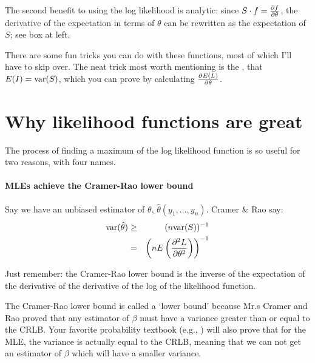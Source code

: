 The second benefit to using the log likelihood is analytic: since $S \cdot
f = {\partial f \over \partial \theta}$, the derivative of the expectation
in terms of $\theta$ can be rewritten as the expectation of $S$; see box
at left.

There are some fun tricks you can do with these functions, most of which
I'll have to skip over.  The neat trick most worth mentioning is the
, that $E(I)=\hbox{var}(S)$, which you can prove by
calculating ${\partial E(L)\over \partial \theta}$.

\section{Why likelihood functions are great} The process of finding a
maximum of the log likelihood function is 
so useful for two reasons, with four names.

\paragraph{MLEs achieve the Cramer-Rao lower bound} 
        		\label{cr} 
Say we have an unbiased estimator of $\theta$,
$\hat\theta(y_1,\dots,y_n)$. Cramer \& Rao say:
\begin{eqnarray}
\hbox{var}(\hat\theta)&\geq&(n \hbox{var}(S))^{-1}		\nonumber\\
		&=&\left(nE\left({\partial^2 L\over \partial
\theta^2}\right)\right)^{-1}			\label{CRLB}
\end{eqnarray}

Just remember: the Cramer-Rao lower bound is the inverse of the expectation of the
derivative of the derivative of the log of the likelihood function.

The Cramer-Rao lower bound is
called a `lower bound' because Mr.s Cramer and Rao proved that any
estimator of $\beta$ must have a variance greater than or equal to the
CRLB. Your favorite probability textbook (e.g., \cite{casella:berger})
will also prove that for the MLE, the variance is actually equal to the
CRLB, meaning that we can not get an estimator of $\beta$ which will
have a smaller variance.

